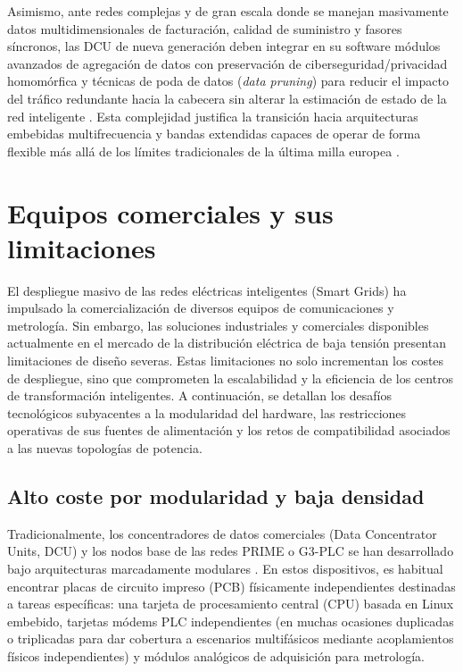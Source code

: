 Asimismo, ante redes complejas y de gran escala donde se manejan masivamente datos multidimensionales de facturación, calidad de suministro y fasores síncronos, las DCU de nueva generación deben integrar en su software módulos avanzados de agregación de datos con preservación de ciberseguridad/privacidad homomórfica y técnicas de poda de datos (\textit{data pruning}) para reducir el impacto del tráfico redundante hacia la cabecera sin alterar la estimación de estado de la red inteligente \cite{9313012, 10268020}. Esta complejidad justifica la transición hacia arquitecturas embebidas multifrecuencia y bandas extendidas capaces de operar de forma flexible más allá de los límites tradicionales de la última milla europea \cite{7007657}.

\section{Equipos comerciales y sus limitaciones}
\label{sec:equipos_comerciales}

El despliegue masivo de las redes eléctricas inteligentes (Smart Grids) ha impulsado la comercialización de diversos equipos de comunicaciones y metrología. Sin embargo, las soluciones industriales y comerciales disponibles actualmente en el mercado de la distribución eléctrica de baja tensión presentan limitaciones de diseño severas. Estas limitaciones no solo incrementan los costes de despliegue, sino que comprometen la escalabilidad y la eficiencia de los centros de transformación inteligentes. A continuación, se detallan los desafíos tecnológicos subyacentes a la modularidad del hardware, las restricciones operativas de sus fuentes de alimentación y los retos de compatibilidad asociados a las nuevas topologías de potencia.

\subsection{Alto coste por modularidad y baja densidad}
\label{subsec:modularidad_baja_densidad}

Tradicionalmente, los concentradores de datos comerciales (Data Concentrator Units, DCU) y los nodos base de las redes PRIME o G3-PLC se han desarrollado bajo arquitecturas marcadamente modulares \cite{6925952}. En estos dispositivos, es habitual encontrar placas de circuito impreso (PCB) físicamente independientes destinadas a tareas específicas: una tarjeta de procesamiento central (CPU) basada en Linux embebido, tarjetas módems PLC independientes (en muchas ocasiones duplicadas o triplicadas para dar cobertura a escenarios multifásicos mediante acoplamientos físicos independientes) y módulos analógicos de adquisición para metrología.

